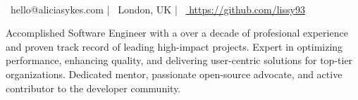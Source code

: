 \documentclass[]{resume-format}
\begin{document}
\begin{center}
      \\
    \vspace{2mm}
    {\faEnvelope\ hello@aliciasykes.com} | {\faMapMarker\ London, UK} | {\faLink\ \href{ https://github.com/lissy93 }{ https://github.com/lissy93 }}
\end{center}


\begin{cvpersonalstatement}
  \item { Accomplished Software Engineer with a over a decade of profesional experience and proven track record of leading high-impact projects. Expert in optimizing performance, enhancing quality, and delivering user-centric solutions for top-tier organizations. Dedicated mentor, passionate open-source advocate, and active contributor to the developer community. }
\end{cvpersonalstatement}


\end{document}
